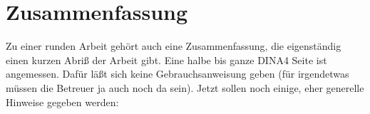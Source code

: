 \chapter{ Zusammenfassung }
Zu einer runden Arbeit gehört auch eine Zusammenfassung, die eigenständig einen kurzen Abriß der Arbeit gibt. Eine halbe bis ganze DINA4 Seite ist angemessen. Dafür läßt sich keine Gebrauchsanweisung geben (für irgendetwas müssen die Betreuer ja auch noch da sein). Jetzt sollen noch einige, eher generelle Hinweise gegeben werden:
